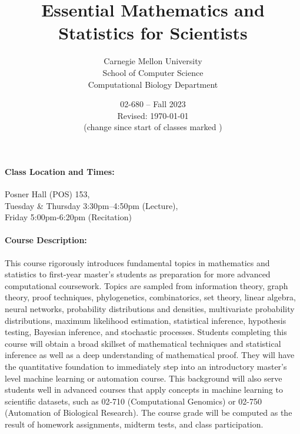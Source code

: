 \documentclass[12pt]{scrartcl}
\title{\large Essential Mathematics and Statistics for Scientists}\let\Title\@title
\subtitle{
{\small
Carnegie Mellon University\\
School of Computer Science\\
Computational Biology Department
}
\vskip-1cm}
\date{\large 02-680 -- Fall 2023\\ \vspace{1em}\small Revised: \today\\(change since start of classes marked \change{}{in orange})}
\author{}
\begin{document}

\maketitle





\paragraph{Class Location and Times:} Posner Hall (POS) 153,\\
\hspace*{3em}Tuesday \& Thursday 3:30pm--4:50pm (Lecture), \\
\hspace*{3em}Friday 5:00pm-6:20pm (Recitation)



\paragraph{Course Description:} 
This course rigorously introduces fundamental topics in mathematics and statistics 
to first-year master's students as preparation for more advanced computational coursework. 
Topics are sampled from information theory, graph theory, proof techniques, phylogenetics, 
combinatorics, set theory, linear algebra, neural networks, probability distributions and densities, 
multivariate probability distributions, maximum likelihood estimation, statistical inference, hypothesis testing, 
Bayesian inference, and stochastic processes. 
Students completing this course will obtain a broad skillset of mathematical techniques and 
statistical inference as well as a deep understanding of mathematical proof. 
They will have the quantitative foundation to immediately step into 
an introductory master's level machine learning or automation course. 
This background will also serve students well in advanced courses that apply concepts in 
machine learning to scientific datasets, such as 
02-710 (Computational Genomics) or 02-750 (Automation of Biological Research). 
The course grade will be computed as the result of homework assignments, midterm tests, and class participation.
\end{document}
